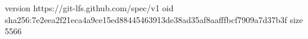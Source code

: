 version https://git-lfs.github.com/spec/v1
oid sha256:7e2eea2f21eca4a9ce15ed88445463913de38ad35af8aafffbcf7909a7d37b3f
size 5566
